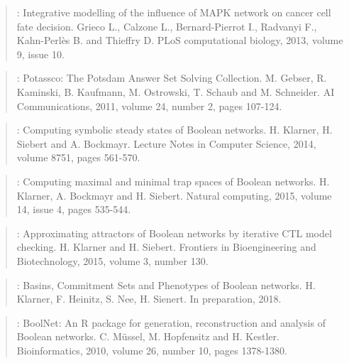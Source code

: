 \documentclass[letterpaper,10pt,english]{sphinxmanual}
\begin{document}
\label{\detokenize{Bibliography:grieco2013}}\begin{quote}

:
Integrative modelling of the influence of MAPK network on cancer cell fate decision.
Grieco L., Calzone L., Bernard-Pierrot I., Radvanyi F., Kahn-Perlès B. and Thieffry D.
PLoS computational biology, 2013, volume 9, issue 10.
\end{quote}
\label{\detokenize{Bibliography:gebser2011}}\begin{quote}

:
Potassco: The Potsdam Answer Set Solving Collection.
M. Gebser, R. Kaminski, B. Kaufmann, M. Ostrowski, T. Schaub and M. Schneider.
AI Communications, 2011, volume 24, number 2, pages 107-124.
\end{quote}
\label{\detokenize{Bibliography:klarner2014}}\begin{quote}

:
Computing symbolic steady states of Boolean networks.
H. Klarner, H. Siebert and A. Bockmayr.
Lecture Notes in Computer Science, 2014, volume 8751, pages 561-570.
\end{quote}
\label{\detokenize{Bibliography:klarner2015trap}}\begin{quote}

:
Computing maximal and minimal trap spaces of Boolean networks.
H. Klarner, A. Bockmayr and H. Siebert.
Natural computing, 2015, volume 14, issue 4, pages 535-544.
\end{quote}
\label{\detokenize{Bibliography:klarner2015approx}}\begin{quote}

:
Approximating attractors of Boolean networks by iterative CTL model checking.
H. Klarner and H. Siebert.
Frontiers in Bioengineering and Biotechnology, 2015, volume 3, number 130.
\end{quote}
\label{\detokenize{Bibliography:klarner2018}}\begin{quote}

:
Basins, Commitment Sets and Phenotypes of Boolean networks.
H. Klarner, F. Heinitz, S. Nee, H. Sienert.
In preparation, 2018.
\end{quote}
\label{\detokenize{Bibliography:mussel2010}}\begin{quote}

:
BoolNet: An R package for generation, reconstruction and analysis of Boolean networks.
C. Müssel, M. Hopfensitz and H. Kestler.
Bioinformatics, 2010, volume 26, number 10, pages 1378-1380.
\end{quote}
\end{document}
